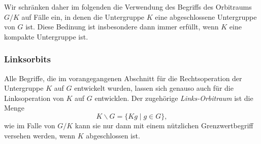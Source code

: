 Wir schränken daher im folgenden die Verwendung des Begriffs des
Orbitraums $G/K$ auf Fälle ein, in denen die Untergruppe $K$ eine
abgeschlossene Untergruppe von $G$ ist.
Diese Bedinung ist insbesondere dann immer erfüllt, wenn $K$ eine
kompakte Untergruppe ist.

%
%
\subsubsection{Linksorbits}
Alle Begriffe, die im vorangegangenen Abschnitt für die Rechtsoperation
der Untergruppe $K$ auf $G$ entwickelt wurden, lassen sich genauso
auch für die Linksoperation von $K$ auf $G$ entwicklen.
Der zugehörige {\em Links-Orbitraum} ist die Menge
\[
K\backslash G
=
\{ Kg \mid g\in G \},
\]
wie im Falle von $G/K$ kann sie nur dann mit einem nützlichen
Grenzwertbegriff versehen werden, wenn $K$ abgeschlossen ist.

